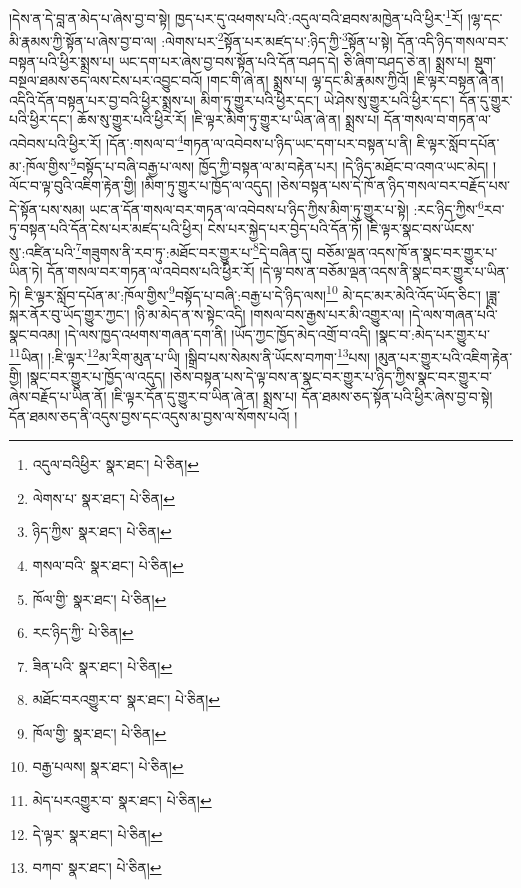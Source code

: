 །དེས་ན་དེ་བླ་ན་མེད་པ་ཞེས་བྱ་བ་སྟེ། ཁྱད་པར་དུ་འཕགས་པའི་:འདུལ་བའི་ཐབས་མཁྱེན་པའི་ཕྱིར་\footnote{འདུལ་བའིཕྱིར་  སྣར་ཐང་།  པེ་ཅིན། }རོ། །ལྷ་དང་མི་རྣམས་ཀྱི་སྟོན་པ་ཞེས་བྱ་བ་ལ། :ལེགས་པར་\footnote{ལེགས་པ་  སྣར་ཐང་།  པེ་ཅིན། }སྟོན་པར་མཛད་པ་:ཉིད་ཀྱི་\footnote{ཉིད་ཀྱིས་  སྣར་ཐང་།  པེ་ཅིན། }སྟོན་པ་སྟེ། དོན་འདི་ཉིད་གསལ་བར་བསྟན་པའི་ཕྱིར་སྨྲས་པ། ཡང་དག་པར་ཞེས་བྱ་བས་སྟོན་པའི་དོན་བཤད་དེ། ཅི་ཞིག་བཤད་ཅེ་ན། སྨྲས་པ། སྡུག་བསྔལ་ཐམས་ཅད་ལས་ངེས་པར་འབྱུང་བའོ། །གང་གི་ཞེ་ན། སྨྲས་པ། ལྷ་དང་མི་རྣམས་ཀྱིའོ། །ཇི་ལྟར་བསྟན་ཞེ་ན། འདིའི་དོན་བསྟན་པར་བྱ་བའི་ཕྱིར་སྨྲས་པ། མིག་ཏུ་གྱུར་པའི་ཕྱིར་དང་། ཡེ་ཤེས་སུ་གྱུར་པའི་ཕྱིར་དང་། དོན་དུ་གྱུར་པའི་ཕྱིར་དང་། ཆོས་སུ་གྱུར་པའི་ཕྱིར་རོ། །ཇི་ལྟར་མིག་ཏུ་གྱུར་པ་ཡིན་ཞེ་ན། སྨྲས་པ། དོན་གསལ་བ་གཏན་ལ་འབེབས་པའི་ཕྱིར་རོ། །དོན་:གསལ་བ་\footnote{གསལ་བའི་  སྣར་ཐང་།  པེ་ཅིན། }གཏན་ལ་འབེབས་པ་ཉིད་ཡང་དག་པར་བསྟན་པ་ནི། ཇི་ལྟར་སློབ་དཔོན་མ་:ཁོལ་གྱིས་\footnote{ཁོལ་གྱི་  སྣར་ཐང་།  པེ་ཅིན། }བསྟོད་པ་བཞི་བརྒྱ་པ་ལས། ཁྱོད་ཀྱི་བསྟན་ལ་མ་བརྟེན་པར། །དེ་ཉིད་མཐོང་བ་འགའ་ཡང་མེད། །ལོང་བ་ལྟ་བུའི་འཇིག་རྟེན་གྱི། །མིག་ཏུ་གྱུར་པ་ཁྱོད་ལ་འདུད། །ཅེས་བསྟན་པས་དེ་ཁོ་ན་ཉིད་གསལ་བར་བརྗོད་པས་དེ་སྟོན་པས་སམ། ཡང་ན་དོན་གསལ་བར་གཏན་ལ་འབེབས་པ་ཉིད་ཀྱིས་མིག་ཏུ་གྱུར་པ་སྟེ། :རང་ཉིད་ཀྱིས་\footnote{རང་ཉིད་ཀྱི་  པེ་ཅིན། }རབ་ཏུ་བསྟན་པའི་དོན་ངེས་པར་མཛད་པའི་ཕྱིར། ངེས་པར་སྐྱེད་པར་བྱེད་པའི་དོན་ཏོ། །ཇི་ལྟར་སྣང་བས་ཡོངས་སུ་:འཛིན་པའི་\footnote{ཟིན་པའི་  སྣར་ཐང་།  པེ་ཅིན། }གཟུགས་ནི་རབ་ཏུ་:མཐོང་བར་གྱུར་པ་\footnote{མཐོང་བརའགྱུར་བ་  སྣར་ཐང་།  པེ་ཅིན། }དེ་བཞིན་དུ། བཅོམ་ལྡན་འདས་ཁོ་ན་སྣང་བར་གྱུར་པ་ཡིན་ཏེ། དོན་གསལ་བར་གཏན་ལ་འབེབས་པའི་ཕྱིར་རོ། །དེ་ལྟ་བས་ན་བཅོམ་ལྡན་འདས་ནི་སྣང་བར་གྱུར་པ་ཡིན་ཏེ། ཇི་ལྟར་སློབ་དཔོན་མ་:ཁོལ་གྱིས་\footnote{ཁོལ་གྱི་  སྣར་ཐང་།  པེ་ཅིན། }བསྟོད་པ་བཞི་:བརྒྱ་པ་དེ་ཉིད་ལས།\footnote{བརྒྱ་པལས།  སྣར་ཐང་།  པེ་ཅིན། } མེ་དང་མར་མེའི་འོད་ཡོད་ཅིང་། །ཟླ་སྐར་ནོར་བུ་ཡོད་གྱུར་ཀྱང་། །ཉི་མ་མེད་ན་ས་སྟེང་འདི། །གསལ་བས་རྒྱས་པར་མི་འགྱུར་ལ། །དེ་ལས་གཞན་པའི་སྣང་བའམ། །དེ་ལས་ཁྱད་འཕགས་གཞན་དག་ནི། །ཡོད་ཀྱང་ཁྱོད་མེད་འགྲོ་བ་འདི། །སྣང་བ་:མེད་པར་གྱུར་པ་\footnote{མེད་པརའགྱུར་བ་  སྣར་ཐང་།  པེ་ཅིན། }ཡིན། །:ཇི་ལྟར་\footnote{དེ་ལྟར་  སྣར་ཐང་།  པེ་ཅིན། }མ་རིག་མུན་པ་ཡི། །སྒྲིབ་པས་སེམས་ནི་ཡོངས་བཀག་\footnote{བཀབ་  སྣར་ཐང་།  པེ་ཅིན། }པས། །མུན་པར་གྱུར་པའི་འཇིག་རྟེན་གྱི། །སྣང་བར་གྱུར་པ་ཁྱོད་ལ་འདུད། །ཅེས་བསྟན་པས་དེ་ལྟ་བས་ན་སྣང་བར་གྱུར་པ་ཉིད་ཀྱིས་སྣང་བར་གྱུར་བ་ཞེས་བརྗོད་པ་ཡིན་ནོ། །ཇི་ལྟར་དོན་དུ་གྱུར་བ་ཡིན་ཞེ་ན། སྨྲས་པ། དོན་ཐམས་ཅད་སྟོན་པའི་ཕྱིར་ཞེས་བྱ་བ་སྟེ། དོན་ཐམས་ཅད་ནི་འདུས་བྱས་དང་འདུས་མ་བྱས་ལ་སོགས་པའོ། །
